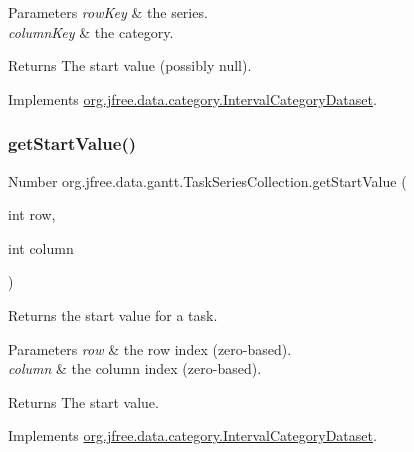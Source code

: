 \begin{DoxyParams}{Parameters}
{\em row\+Key} & the series. \\
\hline
{\em column\+Key} & the category.\\
\hline
\end{DoxyParams}
\begin{DoxyReturn}{Returns}
The start value (possibly {\ttfamily null}). 
\end{DoxyReturn}


Implements \mbox{\hyperlink{interfaceorg_1_1jfree_1_1data_1_1category_1_1_interval_category_dataset_aec932dc7f50bf72be26002494a266e2e}{org.\+jfree.\+data.\+category.\+Interval\+Category\+Dataset}}.

\mbox{\label{classorg_1_1jfree_1_1data_1_1gantt_1_1_task_series_collection_a99c30250fe009aadb13b6f92e35e7d49}} 
\subsubsection{\texorpdfstring{get\+Start\+Value()}{getStartValue()}\hspace{0.1cm}{\footnotesize\ttfamily [2/4]}}
{\footnotesize\ttfamily Number org.\+jfree.\+data.\+gantt.\+Task\+Series\+Collection.\+get\+Start\+Value (\begin{DoxyParamCaption}\item[{int}]{row,  }\item[{int}]{column }\end{DoxyParamCaption})}

Returns the start value for a task.


\begin{DoxyParams}{Parameters}
{\em row} & the row index (zero-\/based). \\
\hline
{\em column} & the column index (zero-\/based).\\
\hline
\end{DoxyParams}
\begin{DoxyReturn}{Returns}
The start value. 
\end{DoxyReturn}


Implements \mbox{\hyperlink{interfaceorg_1_1jfree_1_1data_1_1category_1_1_interval_category_dataset_ab39752773cf77a5ccbbae7851fd16aa6}{org.\+jfree.\+data.\+category.\+Interval\+Category\+Dataset}}.

